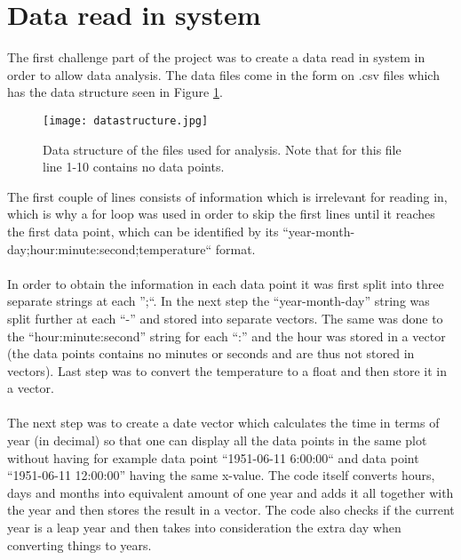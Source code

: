 \documentclass[../main.tex]{subfiles}
\begin{document}
\section{Data read in system}
	The first challenge part of the project was to create a data read in system in order to allow data analysis. The data files come in the form on .csv files which has
	the data structure seen in Figure \ref{datastructure}.
	\begin{figure}[H]
	  \centering
	  \texttt{[image: datastructure.jpg]}
	  \caption{Data structure of the files used for analysis. Note that for this file line 1-10 contains no data points.}
	  \label{datastructure}
	 
	\end{figure}\noindent
	The first couple of lines consists of information which is irrelevant for reading in, which is why a for loop was used in order to skip the first lines until it reaches 
	the first data point, which can be identified by its ``year-month-day;hour:minute:second;temperature`` format.
	\\\\
	In order to obtain the information in each data point it was first split into three separate strings at each '';``. In the next step the ``year-month-day'' string was split 
	further at each ``-'' and stored into separate vectors. The same was done to the ``hour:minute:second'' string for each ``:'' and the hour was stored in a 
	vector (the data points contains no minutes or seconds and are thus not stored in vectors). Last step was to convert the temperature to a float and then store it in a vector. 
	\\\\
	The next step was to create a date vector which calculates the time in terms of year (in decimal) so that one can display all the data points in the same plot without having 
	for example data point ``1951-06-11 6:00:00`` and data point ``1951-06-11 12:00:00'' having the same x-value. The code itself converts hours, days and months into equivalent 
	amount of one year and adds it all together with the year and then stores the result in a vector. The code also checks if the current year is a leap year and then takes 
	into consideration the extra day when converting things to years.
\end{document}

